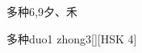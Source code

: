 \begin{entry}{多种}{6,9}{⼣、⽲}
  \begin{phonetics}{多种}{duo1 zhong3}[][HSK 4]
  \end{phonetics}
\end{entry}

